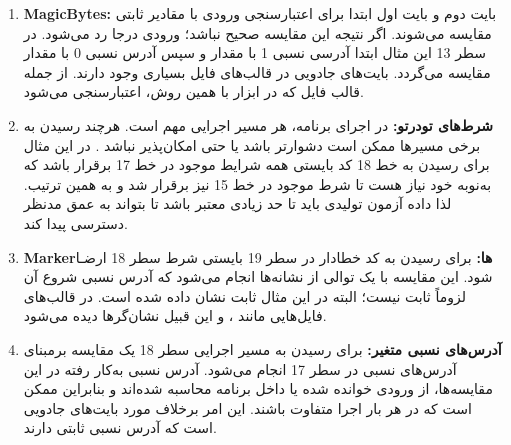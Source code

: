 \begin{enumerate}
	\item{
		\textbf{\glspl{MagicByte}:}
		بایت دوم و بایت اول ابتدا برای اعتبارسنجی ورودی با مقادیر ثابتی مقایسه می‌شوند. اگر نتیجه این مقایسه صحیح نباشد؛ ورودی درجا رد می‌شود. در سطر 13 این مثال ابتدا آدرسی نسبی 1 با مقدار 
		و سپس آدرس نسبی 0 با مقدار
		مقایسه می‌گردد. بایت‌های جادویی در قالب‌های فایل بسیاری وجود دارند. از جمله قالب فایل
		که در ابزار
		با همین روش، اعتبارسنجی می‌شود.
	}
	\item{
		\textbf{شرط‌های تودرتو:}
		در اجرای برنامه، هر مسیر اجرایی مهم است. هرچند رسیدن به برخی مسیرها ممکن است دشوارتر باشد یا حتی امکان‌پذیر نباشد
		\cite{ammann2016introduction}
		. در این مثال برای رسیدن به خط 18 کد بایستی همه شرایط موجود در خط 17 برقرار باشد که به‌نوبه خود نیاز هست تا شرط موجود در خط 15 نیز برقرار شد و به همین ترتیب. لذا داده آزمون تولیدی باید تا حد زیادی معتبر باشد تا بتواند به عمق مدنظر دسترسی پیدا کند.
	}
	\item{
		\textbf{\gls{Marker}}\textbf{ها:}
		برای رسیدن به کد خطادار در سطر 19 بایستی شرط سطر 18 ارضـا شود. این مقایسه با یک توالی از نشانه‌ها انجام می‌شود که آدرس نسبی شروع آن لزوماً ثابت نیست؛ البته در این مثال ثابت نشان داده شده است. در قالب‌های فایل‌هایی مانند
		،
		و 
		این قبیل نشان‌گرها دیده می‌شود.			
	}
	\item{
		\textbf{آدرس‌های نسبی متغیر:}
		برای رسیدن به مسیر اجرایی سطر 18 یک مقایسه برمبنای آدرس‌های نسبی در سطر 17 انجام می‌شود. آدرس نسبی به‌کار رفته در این مقایسه‌ها، از ورودی خوانده شده یا داخل برنامه محاسبه شده‌اند و بنابراین ممکن است که در هر بار اجرا متفاوت باشند. این امر برخلاف مورد بایت‌های جادویی است که آدرس نسبی ثابتی دارند.
	}
	
\end{enumerate}



